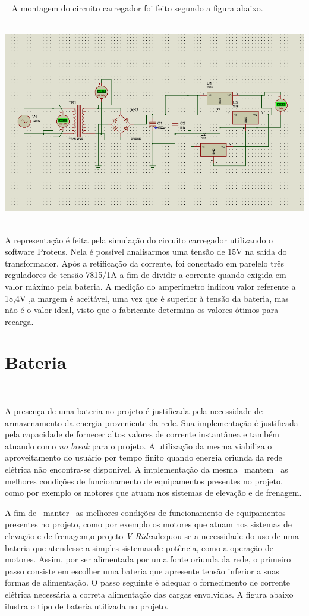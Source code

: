  
A montagem do circuito carregador foi feito segundo a figura abaixo.         
\begin{center}
    \includegraphics[scale=0.7]{figuras/Fonte-15V}
       \label{Fonte.15V}
   \end{center}

A representação é feita pela simulação do circuito carregador utilizando o software Proteus. Nela é possível analisarmos uma tensão de 15V na saída do transformador. Após a retificação da corrente, foi conectado em parelelo três reguladores de tensão 7815/1A a fim de dividir a corrente quando exigida em valor máximo pela bateria. A medição do amperímetro indicou valor referente a 18,4V ,a margem é aceitável, uma vez que é superior à tensão da bateria, mas não é o valor ideal, visto que o fabricante determina os valores ótimos para recarga.

\section{Bateria}  

A presença de uma bateria no projeto é justificada pela necessidade de armazenamento da energia proveniente da rede. Sua implementação é justificada pela capacidade de fornecer altos valores de corrente instantânea e também atuando como \textit{no break} para o projeto. A utilização da mesma viabiliza o aproveitamento do usuário por tempo finito quando energia oriunda da rede elétrica não encontra-se disponível. A implementação da mesma  mantem  as melhores condições de funcionamento de equipamentos presentes no projeto, como por exemplo os motores que atuam nos sistemas de elevação e de frenagem.

A fim de  manter  as melhores condições de funcionamento de equipamentos presentes no projeto, como por exemplo os motores que atuam nos sistemas de elevação e de frenagem,o projeto \textit{V-Ride}adequou-se a necessidade do uso de uma bateria que atendesse a simples sistemas de potência, como a operação de motores. Assim, por ser alimentada por uma fonte oriunda da rede, o primeiro passo consiste em escolher uma bateria que apresente tensão inferior a suas formas de alimentação. O passo seguinte é adequar o fornecimento de corrente elétrica necessária a correta alimentação das cargas envolvidas. A figura abaixo ilustra o tipo de bateria utilizada no projeto.

